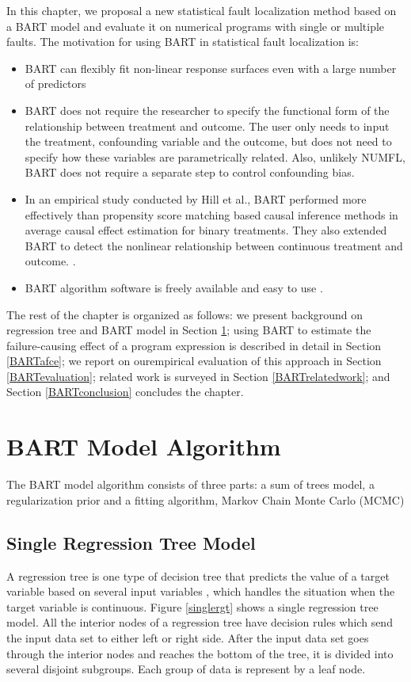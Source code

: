 In this chapter, we proposal a new statistical fault localization method based on a BART model and evaluate it on numerical programs with single or multiple faults. The motivation for using BART in statistical fault localization is:
\vspace{-0.2cm}
\begin{itemize}
\item BART can flexibly fit non-linear response surfaces even with a large number of predictors
\item BART does not require the researcher to specify the functional form of the relationship between treatment and outcome. The user only needs to input the treatment, confounding variable and the outcome, but does not need to specify how these variables are parametrically related. Also, unlikely NUMFL, BART does not require a separate step to control confounding bias.
\item In an empirical study conducted by Hill et al., BART performed more effectively than propensity score matching based causal inference methods in average causal effect estimation for binary treatments. They also extended BART to detect the nonlinear relationship between continuous treatment and outcome. \cite{hill2012bayesian, hill2013assessing}.
\item BART algorithm software is freely available and easy to use \cite{BARTMachine}.
\end{itemize}

The rest of the chapter is organized as follows: we present background on regression tree and BART model in Section \ref{BARTbg}; using BART to estimate the failure-causing effect of a program expression is described in detail in Section \ref{BARTafce};  we report on ourempirical evaluation of this approach in Section \ref{BARTevaluation}; related work is surveyed in Section \ref{BARTrelatedwork}; and Section \ref{BARTconclusion} concludes the chapter.

\section{BART Model Algorithm}\label{BARTbg}%
The BART model algorithm consists of three parts: a sum of trees model, a regularization prior and a fitting algorithm, Markov Chain Monte Carlo (MCMC)
\subsection{Single Regression Tree Model}
A regression tree is one type of decision tree that predicts the value of a target variable based on several input variables \cite{loh2011classification}, which handles the situation when the target variable is continuous. Figure \ref{singlergt} shows a single regression tree model. All the interior nodes of a regression tree have decision rules which send the input data set to either left or right side. After the input data set goes through the interior nodes and reaches the bottom of the tree, it is divided into several disjoint subgroups. Each group of data is represent by a leaf node.


